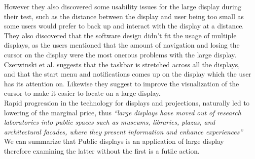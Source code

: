 However they also discovered some usability issues for the large display during their test, such as the distance between the display and user being too small as some users would prefer to back up and interact with the display at a distance. They also discovered that the software design didn't fit the usage of multiple displays, as the users mentioned that the amount of navigation and losing the cursor on the display were the most onerous problems with the large display.
Czerwinski et al. suggests that the taskbar is stretched across all the displays, and that the start menu and notifications comes up on the display which the user has its attention on. Likewise they suggest to improve the  visualization of the cursor to make it easier to locate on a large display.\cite{Czerwinski:2003}\\

Rapid progression in the technology for displays and projections, naturally led to lowering of the marginal price, thus \emph{``large displays have moved out of research laboratories into public spaces such as museums, libraries, plazas, and architectural facades, where they present information and enhance experiences''} \cite{Hinrichs:2013:IPD:2478559.2478965}\\

We can summarize that Public displays is an application of large display therefore examining the latter without the first is a futile action.